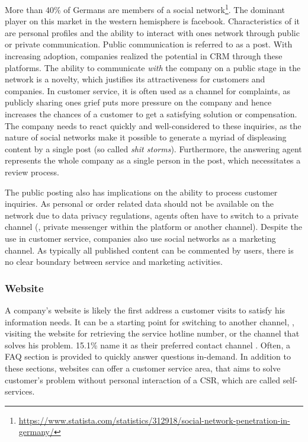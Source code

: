 		More than 40\% of Germans are members of a social network\footnote{\cf \url{https://www.statista.com/statistics/312918/social-network-penetration-in-germany/}}. The dominant player on this market in the western hemisphere is facebook. Characteristics of it are personal profiles and the ability to interact with ones network through public or private communication. Public communication is referred to as a post. With increasing adoption, companies realized the potential in \acrshort{CRM} through these platforms. The ability to communicate \textit{with} the company on a public stage in the network is a novelty, which justifies its attractiveness for customers and companies. In customer service, it is often used as a channel for complaints, as publicly sharing ones grief puts more pressure on the company and hence increases the chances of a customer to get a satisfying solution or compensation. The company needs to react quickly and well-considered to these inquiries, as the nature of social networks make it possible to generate a myriad of displeasing content by a single post (so called \textit{shit storms}). Furthermore, the answering agent represents the whole company as a single person in the post, which necessitates a review process. 
		
		The public posting also has implications on the ability to process customer inquiries. As personal or order related data should not be available on the network due to data privacy regulations, agents often have to switch to a private channel (\eg, private messenger within the platform or another channel). Despite the use in customer service, companies also use social networks as a marketing channel. As typically all published content can be commented by users, there is no clear boundary between service and marketing activities. 
		
		
		\subsubsection{Website}
		
		A company's website is likely the first address a customer visits to satisfy his information needs. It can be a starting point for switching to another channel, \ie, visiting the website for retrieving the service hotline number, or the channel that solves his problem. 15.1\% name it as their preferred contact channel \citep{Agnischock2015}. Often, a \acrfull{FAQ} section is provided to quickly answer questions in-demand. In addition to these sections, websites can offer a customer service area, that aims to solve customer's problem without personal interaction of a \acrshort{CSR}, which are called self-services. 
			
